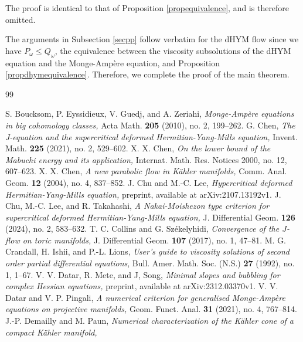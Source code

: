 \documentclass{amsart}
\numberwithin{equation}{section}
\theoremstyle{plain}
\theoremstyle{definition}
\theoremstyle{remark}
\begin{document}
The proof is identical to that of Proposition \ref{propequivalence}, and is therefore omitted.

The arguments in Subsection \ref{secpp} follow verbatim for the dHYM flow since we have $P_\omega\le Q_\omega$, the equivalence between the viscosity subsolutions of the dHYM equation and the Monge-Amp{\`e}re equation, and Proposition \ref{propdhymequivalence}. Therefore, we complete the proof of the main theorem.

\begin{thebibliography}{99}

  S. Boucksom, P. Eyssidieux, V. Guedj, and A. Zeriahi, 
  \textit{Monge-Amp{\`e}re equations in big cohomology classes,}
  Acta Math. \textbf{205} (2010), no. 2, 199--262.
  G. Chen, 
  \textit{The J-equation and the supercritical deformed Hermitian-Yang-Mills equation,} 
  Invent. Math. \textbf{225} (2021), no. 2, 529--602. 
  X. X. Chen, 
  \textit{On the lower bound of the Mabuchi energy and its application,}
  Internat. Math. Res. Notices 2000, no. 12, 607--623. 
  X. X. Chen, 
  \textit{A new parabolic flow in K{\"a}hler manifolds,} 
  Comm. Anal. Geom. \textbf{12} (2004), no. 4, 837--852.
  J. Chu and M.-C. Lee,
  \textit{Hypercritical deformed Hermitian-Yang-Mills equation,}
  preprint, available at arXiv:2107.13192v1.
  J. Chu, M.-C. Lee, and R. Takahashi, 
  \textit{A Nakai-Moishezon type criterion for supercritical deformed Hermitian-Yang-Mills equation,} 
  J. Differential Geom. \textbf{126} (2024), no. 2, 583--632.
  T. C. Collins and G. Sz{\'e}kelyhidi, 
  \textit{Convergence of the $J$-flow on toric manifolds,} 
  J. Differential Geom. \textbf{107} (2017), no. 1, 47--81.
  M. G. Crandall, H. Ishii, and P.-L. Lions, 
  \textit{User's guide to viscosity solutions of second order partial differential equations}, 
  Bull. Amer. Math. Soc. (N.S.) \textbf{27} (1992), no. 1, 1--67.
  V. V. Datar, R. Mete, and J, Song,
  \textit{Minimal slopes and bubbling for complex Hessian equations,}
  preprint, available at arXiv:2312.03370v1.
  V. V. Datar and V. P. Pingali, 
  \textit{A numerical criterion for generalised Monge-Ampère equations on projective manifolds,}
  Geom. Funct. Anal. \textbf{31} (2021), no. 4, 767--814.
  J.-P. Demailly and M. Paun, 
  \textit{Numerical characterization of the K{\"a}hler cone of a compact K{\"a}hler manifold,} 

\end{thebibliography}
\end{document}
